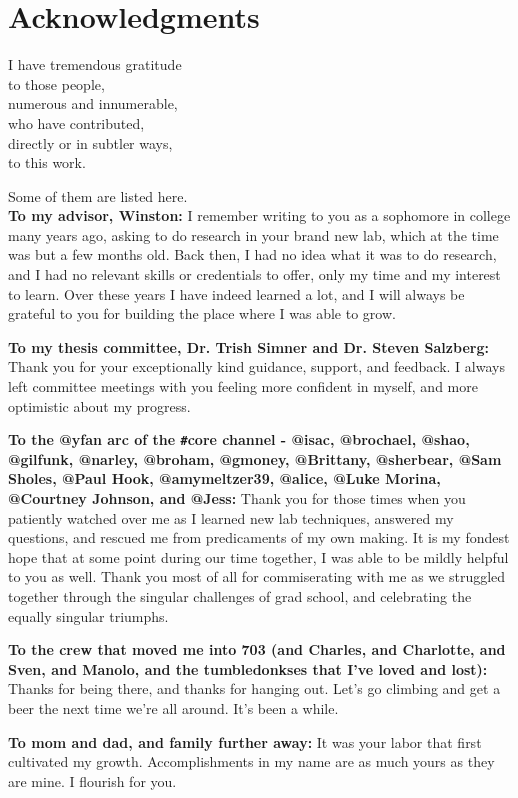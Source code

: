 \chapter*{Acknowledgments}

I have tremendous gratitude \\
to those people, \\
numerous and innumerable, \\
who have contributed, \\
directly or in subtler ways, \\
to this work.

Some of them are listed here. \\

\textbf{To my advisor, Winston:} I remember writing to you as a sophomore in college many years ago, asking to do research in your brand new lab, which at the time was but a few months old. Back then, I had no idea what it was to do research, and I had no relevant skills or credentials to offer, only my time and my interest to learn. Over these years I have indeed learned a lot, and I will always be grateful to you for building the place where I was able to grow.

\textbf{To my thesis committee, Dr. Trish Simner and Dr. Steven Salzberg:} Thank you for your exceptionally kind guidance, support, and feedback. I always left committee meetings with you feeling more confident in myself, and more optimistic about my progress.

\textbf{To the @yfan arc of the \texttt{\#}core channel - @isac, @brochael, @shao, @gilfunk, @narley, @broham, @gmoney, @Brittany, @sherbear, @Sam Sholes, @Paul Hook, @amymeltzer39, @alice, @Luke Morina, @Courtney Johnson, and @Jess:} Thank you for those times when you patiently watched over me as I learned new lab techniques, answered my questions, and rescued me from predicaments of my own making. It is my fondest hope that at some point during our time together, I was able to be mildly helpful to you as well. Thank you most of all for commiserating with me as we struggled together through the singular challenges of grad school, and celebrating the equally singular triumphs.

\textbf{To the crew that moved me into 703 (and Charles, and Charlotte, and Sven, and Manolo, and the tumbledonkses that I've loved and lost):} Thanks for being there, and thanks for hanging out. Let's go climbing and get a beer the next time we're all around. It's been a while.

\textbf{To mom and dad, and family further away:} It was your labor that first cultivated my growth. Accomplishments in my name are as much yours as they are mine. I flourish for you.
